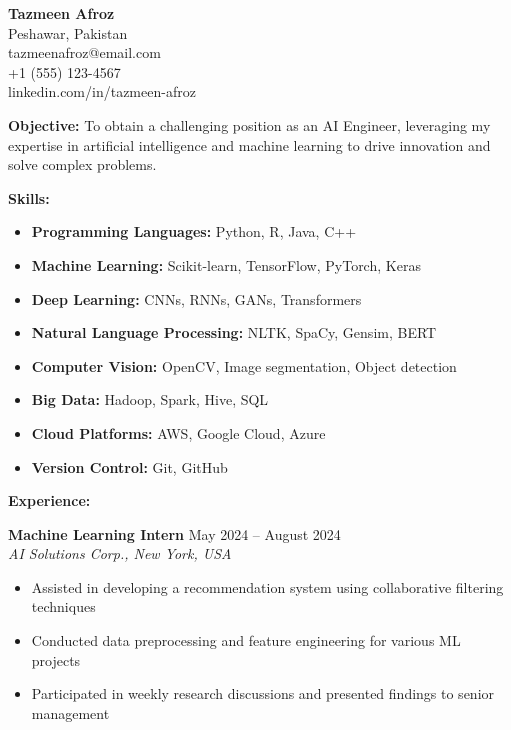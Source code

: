 \documentclass[a4paper,12pt]{article}
\begin{document}
\vspace*{-5em}

\noindent
\begin{minipage}[t]{0.7\textwidth}
    \raggedright
    \textbf{Tazmeen Afroz} \\ %
    Peshawar, Pakistan \\
    tazmeenafroz@email.com \\
    +1 (555) 123-4567 \\
    linkedin.com/in/tazmeen-afroz
\end{minipage}%
\hfill

\vspace{1em}
\noindent
\textbf{Objective:} To obtain a challenging position as an AI Engineer, leveraging my expertise in artificial intelligence and machine learning to drive innovation and solve complex problems.

\vspace{1em}
\noindent
\textbf{Skills:}
\begin{itemize}[leftmargin=*]
    \item \textbf{Programming Languages:} Python, R, Java, C++
    \item \textbf{Machine Learning:} Scikit-learn, TensorFlow, PyTorch, Keras
    \item \textbf{Deep Learning:} CNNs, RNNs, GANs, Transformers
    \item \textbf{Natural Language Processing:} NLTK, SpaCy, Gensim, BERT
    \item \textbf{Computer Vision:} OpenCV, Image segmentation, Object detection
    \item \textbf{Big Data:} Hadoop, Spark, Hive, SQL
    \item \textbf{Cloud Platforms:} AWS, Google Cloud, Azure
    \item \textbf{Version Control:} Git, GitHub
\end{itemize}

\textbf{Experience:}



\textbf{Machine Learning Intern} \hfill May 2024 -- August 2024 \\
\textit{AI Solutions Corp., New York, USA}
\begin{itemize}[leftmargin=*]
    \item Assisted in developing a recommendation system using collaborative filtering techniques
    \item Conducted data preprocessing and feature engineering for various ML projects
    \item Participated in weekly research discussions and presented findings to senior management
\end{itemize}
\end{document}

